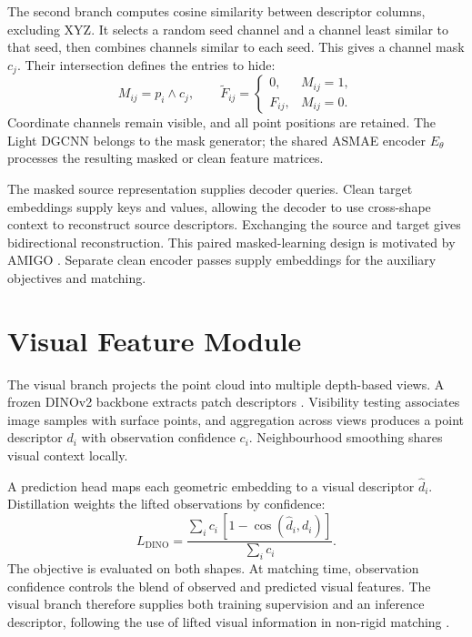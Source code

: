 The second branch computes cosine similarity between descriptor columns, excluding XYZ. It selects a random seed channel and a channel least similar to that seed, then combines channels similar to each seed. This gives a channel mask $c_j$. Their intersection defines the entries to hide:
\begin{equation}
 M_{ij}=p_i\land c_j,\qquad
 \widetilde F_{ij}=\begin{cases}0,&M_{ij}=1,\\ F_{ij},&M_{ij}=0.\end{cases}
\end{equation}
Coordinate channels remain visible, and all point positions are retained. The Light DGCNN belongs to the mask generator; the shared ASMAE encoder $E_\theta$ processes the resulting masked or clean feature matrices.

The masked source representation supplies decoder queries. Clean target embeddings supply keys and values, allowing the decoder to use cross-shape context to reconstruct source descriptors. Exchanging the source and target gives bidirectional reconstruction. This paired masked-learning design is motivated by AMIGO \citep{article}. Separate clean encoder passes supply embeddings for the auxiliary objectives and matching.

\section{Visual Feature Module}
The visual branch projects the point cloud into multiple depth-based views. A frozen DINOv2 backbone extracts patch descriptors \citep{oquab2024dinov2learningrobustvisual}. Visibility testing associates image samples with surface points, and aggregation across views produces a point descriptor $d_i$ with observation confidence $c_i$. Neighbourhood smoothing shares visual context locally.

A prediction head maps each geometric embedding to a visual descriptor $\hat d_i$. Distillation weights the lifted observations by confidence:
\begin{equation}
 L_{\mathrm{DINO}}=
 \frac{\sum_i c_i\,[1-\cos(\hat d_i,d_i)]}{\sum_i c_i}.
\end{equation}
The objective is evaluated on both shapes. At matching time, observation confidence controls the blend of observed and predicted visual features. The visual branch therefore supplies both training supervision and an inference descriptor, following the use of lifted visual information in non-rigid matching \citep{Chen_2025_CVPR}.

